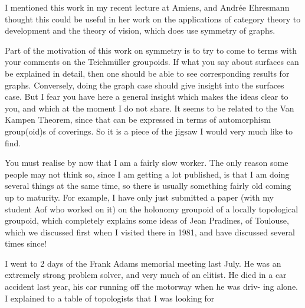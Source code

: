 I mentioned this work in my recent lecture at Amiens, and Andrée
Ehresmann thought this could be useful in her work on the applications of
category theory to development and the theory of vision, which does use
symmetry of graphs.

Part of the motivation of this work on symmetry is to try to come to
terms with your comments on the Teichmüller groupoids. If what you say
about surfaces can be explained in detail, then one should be able to see
corresponding results for graphs. Conversely, doing the graph case should
give insight into the surfaces case. But I fear you have here a general
insight which makes the ideas clear to you, and which at the moment I do not
share. It seems to be related to the Van Kampen Theorem, since that can be
expressed in terms of automorphism group(oid)s of coverings. So it is a
piece of the jigsaw I would very much like to find.

You must realise by now that I am a fairly slow worker. The only
reason some people may not think so, since I am getting a lot published, is
that I am doing several things at the same time, so there is usually
something fairly old coming up to maturity. For example, I have only just
submitted a paper (with my student Aof who worked on it) on the holonomy
groupoid of a locally topological groupoid, which completely explains some
ideas of Jean Pradines, of Toulouse, which we discussed first when I visited
there in 1981, and have discussed several times since!

I went to 2 days of the Frank Adams memorial meeting last July. He was
an extremely strong problem solver, and very much of an elitist. He died in
a car accident last year, his car running off the motorway when he was driv-%
ing alone. I explained to a table of topologists that I was looking for


